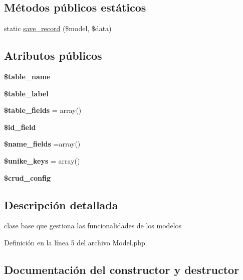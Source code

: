 \subsection*{Métodos públicos estáticos}
\begin{DoxyCompactItemize}
\item 
static \mbox{\hyperlink{class_model_a740d72b25fc3721184b8e304ab1d5c50}{save\+\_\+record}} (\$model, \$data)
\end{DoxyCompactItemize}
\subsection*{Atributos públicos}
\begin{DoxyCompactItemize}
\item 
\mbox{\label{class_model_a62f67587e29b2aa93736f38c97c56c65}} 
{\bfseries \$table\+\_\+name}
\item 
\mbox{\label{class_model_ace211b9f546fe7d6bc2ea14cbcfbedce}} 
{\bfseries \$table\+\_\+label}
\item 
\mbox{\label{class_model_aae5dcd1ecd7548a6a494a6807e28cc07}} 
{\bfseries \$table\+\_\+fields} = array()
\item 
\mbox{\label{class_model_a3d6b4d251b99d01427ce9f9d9e7cbbb3}} 
{\bfseries \$id\+\_\+field}
\item 
\mbox{\label{class_model_aac464bb0d649295a3b89456954116001}} 
{\bfseries \$name\+\_\+fields} =array()
\item 
\mbox{\label{class_model_a4758f4b279f7fcb936bc191235f0d269}} 
{\bfseries \$unike\+\_\+keys} = array()
\item 
{\bfseries \$crud\+\_\+config}
\end{DoxyCompactItemize}


\subsection{Descripción detallada}
clase base que gestiona las funcionalidades de los modelos 

Definición en la línea 5 del archivo Model.\+php.



\subsection{Documentación del constructor y destructor}
\mbox{\label{class_model_a186f8fcbe8092f888ba40e4ecef9f6a5}} 
